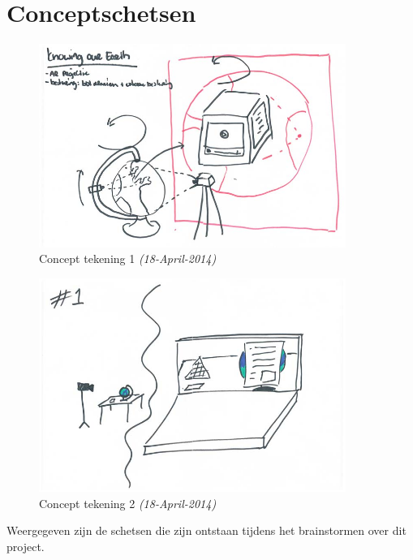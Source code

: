 \section{Conceptschetsen} \label{sec:conceptschetsen}
\begin{figure}[h]
  \includegraphics[width=100mm]{figs/concept1.jpg}
  \caption{Concept tekening 1 \textit{(18-April-2014)}}
  \label{fig:concept1}
\end{figure}
\begin{figure}[h]
  \includegraphics[width=100mm]{figs/concept2.jpg}
  \caption{Concept tekening 2 \textit{(18-April-2014)}}
  \label{fig:concept2}
\end{figure}
Weergegeven zijn de schetsen die zijn ontstaan tijdens het brainstormen over dit project.